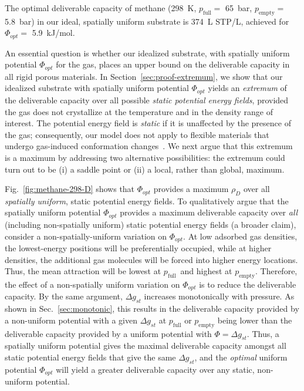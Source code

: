 \documentclass[pre,twocolumn]{revtex4-2}
\newcommand\V{\Phi}
\newcommand\pfull{\ensuremath{p_{\text{full}}}}
\newcommand\pempty{\ensuremath{p_{\text{empty}}}}
\newcommand\gst{\ensuremath{\Delta g_{st}}}
\begin{document}
The optimal deliverable capacity of methane (298\ K, $\pfull=$ 65\ bar,
$\pempty=$ 5.8\ bar) in our ideal, spatially uniform substrate is 374\ L STP/L,
achieved for $\V_{opt} =$ 5.9\ kJ/mol.

An essential question is whether our idealized substrate, with spatially
uniform potential $\V_{opt}$ for the gas, places an upper bound on the
deliverable capacity in all rigid porous materials. In
Section~\ref{sec:proof-extremum}, we show that our idealized substrate with
spatially uniform potential $\V_{opt}$ yields an \emph{extremum} of the
deliverable capacity over all possible \emph{static potential energy fields},
provided the gas does not crystallize at the temperature and in the density
range of interest. The potential energy field is \emph{static} if it is
unaffected by the presence of the gas; consequently, our model does not apply
to flexible materials that undergo gas-induced conformation
changes~\cite{schneemann2014flexible}. We next argue that this extremum is a
maximum by addressing two alternative possibilities: the extremum could turn
out to be (i) a saddle point or (ii) a local, rather than global, maximum.

Fig.~\ref{fig:methane-298-D} shows that $\V_{opt}$ provides a maximum
$\rho_D$ over all \emph{spatially uniform}, static potential energy fields. To
qualitatively argue that the spatially uniform potential $\V_{opt}$ provides a
maximum deliverable capacity over \emph{all} (including non-spatially uniform)
static potential energy fields (a broader claim), consider a
non-spatially-uniform variation on $\V_{opt}$. 
At low adsorbed gas densities, the lowest-energy positions will be preferentially occupied, while
at higher densities, the additional gas molecules will be forced into higher
energy locations. Thus, the mean attraction will be lowest at \pfull\ and
highest at \pempty. 
Therefore, the effect of a non-spatially uniform variation on $\V_{opt}$ is to reduce the deliverable capacity.
By the same argument, $\gst$ increases monotonically with
pressure. As shown in Sec.~\ref{sec:monotonic}, this results in
the deliverable capacity provided by a non-uniform potential with a given $\gst$ at $\pfull$ or $\pempty$ being lower than the
deliverable capacity provided by a uniform potential with $\V=\gst$. Thus, a spatially uniform potential gives the maximal
deliverable capacity amongst all static potential energy fields that give the
same $\gst$, and the \emph{optimal} uniform potential $\V_{opt}$ will yield a
greater deliverable capacity over any static, non-uniform potential.
\end{document}
